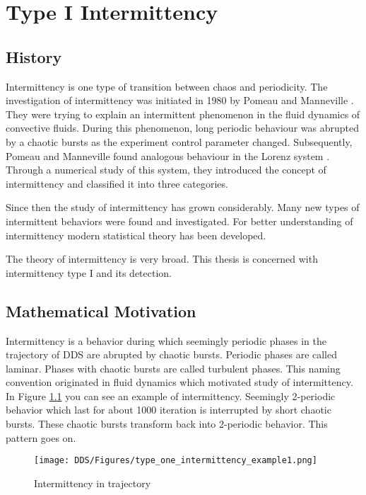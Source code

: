 \chapter{Type I Intermittency}
\label{chap:intermittency_review}

\section{History}
Intermittency is one type of transition between chaos and periodicity.
The investigation of intermittency was initiated in 1980 by Pomeau and Manneville \cite{Pomeau1980}.
They were trying to explain an intermittent phenomenon in the fluid dynamics of convective fluids.
During this phenomenon, long periodic behaviour was abrupted by a chaotic bursts as the experiment control parameter changed.
Subsequently, Pomeau and Manneville found analogous behaviour in the Lorenz system \cite{Lorenz2004}.
Through a numerical study of this system, they introduced the concept of intermittency and classified it into three categories. \cite{Pomeau1980}
\par
Since then the study of intermittency has grown considerably.
Many new types of intermittent behaviors were found and investigated.
For better understanding of intermittency modern statistical theory has been developed.
\cite{Elaskar2017}
\par
The theory of intermittency is very broad.
This thesis is concerned with intermittency type I and its detection.

\section{Mathematical Motivation}
Intermittency is a behavior during which seemingly periodic phases in the trajectory of DDS are abrupted by chaotic bursts.
Periodic phases are called laminar.
Phases with chaotic bursts are called turbulent phases.
This naming convention originated in fluid dynamics which motivated study of intermittency. \cite{Pomeau1980}
\\
In Figure \ref{fig:intermittent_trajectory_example} you can see an example of intermittency.
Seemingly 2-periodic behavior which last for about 1000 iteration is interrupted by short chaotic bursts.
These chaotic bursts transform back into 2-periodic behavior.
This pattern goes on.

\begin{figure}[!h]
    \centering
    \texttt{[image: DDS/Figures/type\_one\_intermittency\_example1.png]}
    \caption{Intermittency in trajectory}
    \label{fig:intermittent_trajectory_example}
\end{figure}

